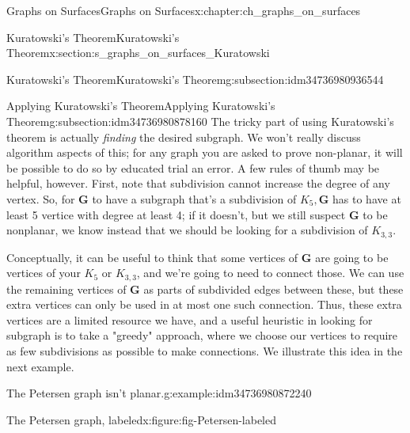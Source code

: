 \documentclass[oneside,10pt,]{book}
\numberwithin{equation}{section}
\newcommand{\bfG}{\mathbf{G}}
\begin{document}
\begin{chapterptx}{Graphs on Surfaces}{}{Graphs on Surfaces}{}{}{x:chapter:ch_graphs_on_surfaces}
\begin{sectionptx}{Kuratowski's Theorem}{}{Kuratowski's Theorem}{}{}{x:section:s_graphs_on_surfaces_Kuratowski}
\begin{subsectionptx}{Kuratowski's Theorem}{}{Kuratowski's Theorem}{}{}{g:subsection:idm34736980936544}
\end{subsectionptx}
%
%
\typeout{************************************************}
\typeout{************************************************}
%
\begin{subsectionptx}{Applying Kuratowski's Theorem}{}{Applying Kuratowski's Theorem}{}{}{g:subsection:idm34736980878160}
The tricky part of using Kuratowski's theorem is actually \emph{finding} the desired subgraph.  We won't really discuss algorithm aspects of this; for any graph you are asked to prove non-planar, it will be possible to do so by educated trial an error.  A few rules of thumb may be helpful, however.  First, note that subdivision cannot increase the degree of any vertex.  So, for \(\bfG\) to have a subgraph that's a subdivision of \(K_5, \bfG\) has to have at least 5 vertice with degree at least 4; if it doesn't, but we still suspect \(\bfG\) to be nonplanar, we know instead that we should be looking for a subdivision of \(K_{3,3}\).%
\par
Conceptually, it can be useful to think that some vertices of \(\bfG\) are going to be vertices of your \(K_5\) or \(K_{3,3}\), and we're going to need to connect those.  We can use the remaining vertices of \(\bfG\) as parts of subdivided edges between these, but these extra vertices can only be used in at most one such connection.  Thus, these extra vertices are a limited resource we have, and a useful heuristic in looking for subgraph is to take a "greedy" approach, where we choose our vertices to require as few subdivisions as possible to make connections.  We illustrate this idea in the next example.%
\begin{example}{The Petersen graph isn't planar.}{g:example:idm34736980872240}%
\begin{figureptx}{The Petersen graph, labeled}{x:figure:fig-Petersen-labeled}{}%
\begin{image}{0.05}{0.9}{0.05}%
\end{image}
\end{figureptx}
\end{example}
\end{subsectionptx}
\end{sectionptx}
\end{chapterptx}
\end{document}
